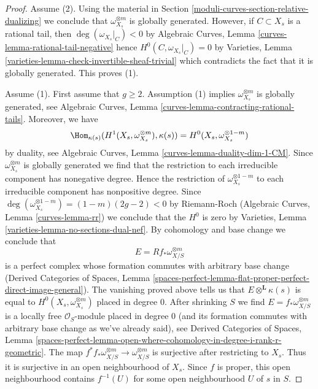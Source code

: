 \begin{proof}
Assume (2). Using the material in Section \ref{moduli-curves-section-relative-dualizing}
we conclude that $\omega_{X_s}^{\otimes m}$ is
globally generated. However, if $C \subset X_s$
is a rational tail, then $\deg(\omega_{X_s}|_C) < 0$ by
Algebraic Curves, Lemma \ref{curves-lemma-rational-tail-negative}
hence $H^0(C, \omega_{X_s}|_C) = 0$ by
Varieties, Lemma \ref{varieties-lemma-check-invertible-sheaf-trivial}
which contradicts the fact that it is globally generated.
This proves (1).

\medskip\noindent
Assume (1). First assume that $g \geq 2$. Assumption (1)
implies $\omega_{X_s}^{\otimes m}$ is globally generated,
see Algebraic Curves, Lemma \ref{curves-lemma-contracting-rational-tails}.
Moreover, we have
$$
\Hom_{\kappa(s)}(H^1(X_s, \omega_{X_s}^{\otimes m}), \kappa(s)) =
H^0(X_s, \omega_{X_s}^{\otimes 1 - m})
$$
by duality, see Algebraic Curves, Lemma \ref{curves-lemma-duality-dim-1-CM}.
Since $\omega_{X_s}^{\otimes m}$ is globally generated we find
that the restriction to each irreducible component has nonegative degree.
Hence the restriction of $\omega_{X_s}^{\otimes 1 - m}$ to each
irreducible component has nonpositive degree. Since
$\deg(\omega_{X_s}^{\otimes 1 - m}) = (1 - m)(2g - 2) < 0$ by Riemann-Roch
(Algebraic Curves, Lemma \ref{curves-lemma-rr}) we conclude that the $H^0$
is zero by Varieties, Lemma \ref{varieties-lemma-no-sections-dual-nef}.
By cohomology and base change we conclude that
$$
E = Rf_*\omega_{X/S}^{\otimes m}
$$
is a perfect complex whose formation commutes with arbitrary base change
(Derived Categories of Spaces, Lemma
\ref{spaces-perfect-lemma-flat-proper-perfect-direct-image-general}).
The vanishing proved above tells us that $E \otimes^\mathbf{L} \kappa(s)$
is equal to $H^0(X_s, \omega_{X_s}^{\otimes m})$ placed in degree $0$.
After shrinking $S$ we find $E = f_*\omega_{X/S}^{\otimes m}$
is a locally free $\mathcal{O}_S$-module placed in degree $0$
(and its formation commutes with arbitrary base change as
we've already said), see Derived Categories of Spaces, Lemma
\ref{spaces-perfect-lemma-open-where-cohomology-in-degree-i-rank-r-geometric}.
The map $f^*f_*\omega_{X/S}^{\otimes m} \to \omega_{X/S}^{\otimes m}$
is surjective after restricting to $X_s$. Thus it is surjective in
an open neighbourhood of $X_s$. Since $f$ is proper, this open
neighbourhood contains $f^{-1}(U)$ for some open neighbourhood
$U$ of $s$ in $S$.


\end{proof}
